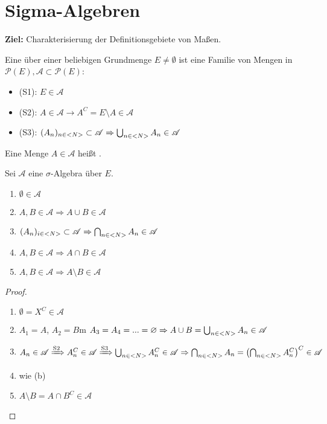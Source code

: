 \section{Sigma-Algebren}

\textbf{Ziel:} Charakterisierung der Definitionsgebiete von Maßen.

\begin{definition}
	Eine  über einer beliebigen Grundmenge $E \neq \emptyset$ ist eine Familie von Mengen in $\mathscr{P}(E), \mathscr{A} \subset \mathscr{P}(E)$:
	\begin{itemize}
		\item (S1): $E \in \mathscr{A}$
		\item (S2): $A \in \mathscr{A} \to A^C = E \setminus A \in \mathscr{A}$
		\item (S3): $(A_n)_{n\in <N>} \subset \mathscr{A} \Rightarrow \bigcup_{n\in <N>}A_n \in \mathscr{A}$
	\end{itemize}
	Eine Menge $A\in\mathscr{A}$ heißt .
\end{definition}

\begin{proposition}
	Sei $\mathscr{A}$ eine $\sigma$-Algebra über $E$.
	\begin{enumerate}[label=(\alph*)]
		\item $\emptyset\in\mathscr{A}$
		\item $A,B\in\mathscr{A}\Rightarrow A\cup B\in\mathscr{A}$
		\item $(A_n)_{i\in<N>}\subset\mathscr{A}\Rightarrow\bigcap_{n\in <N>}A_n\in\mathscr{A}$
		\item $A,B\in\mathscr{A}\Rightarrow A\cap B\in\mathscr{A}$
		\item $A,B\in\mathscr{A}\Rightarrow A\setminus B\in\mathscr{A}$
	\end{enumerate}
\end{proposition}
\begin{proof}
	\begin{enumerate}[label=(\alph*)]
		\item $\emptyset=X^C\in\mathscr{A}$
		\item $A_1=A$, $A_2=B$m $A_3=A_4=...=\varnothing\Rightarrow A\cup B=\bigcup_{n\in <N>} A_n\in\mathscr{A}$
		\item $A_n\in\mathscr{A}\xRightarrow{\text{S2}}A_n^C\in\mathscr{A}\xRightarrow{\text{S3}}\bigcup_{n\in <N>} A_n^C\in\mathscr{A}\Rightarrow\bigcap_{n\in <N>}A_n=\left(\bigcap_{n\in <N>} A_n^C\right)^C\in\mathscr{A}$
		\item wie (b)
		\item $A\setminus B=A\cap B^C\in\mathscr{A}$
	\end{enumerate}
\end{proof}

